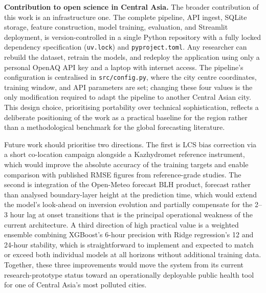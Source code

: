 \textbf{Contribution to open science in Central Asia.} The broader contribution of this work is an infrastructure one. The complete pipeline, API ingest, SQLite storage, feature construction, model training, evaluation, and Streamlit deployment, is version-controlled in a single Python repository with a fully locked dependency specification (\texttt{uv.lock}) and \texttt{pyproject.toml}. Any researcher can rebuild the dataset, retrain the models, and redeploy the application using only a personal OpenAQ API key and a laptop with internet access. The pipeline's configuration is centralised in \texttt{src/config.py}, where the city centre coordinates, training window, and API parameters are set; changing these four values is the only modification required to adapt the pipeline to another Central Asian city. This design choice, prioritising portability over technical sophistication, reflects a deliberate positioning of the work as a practical baseline for the region rather than a methodological benchmark for the global forecasting literature.

Future work should prioritise two directions. The first is LCS bias correction via a short co-location campaign alongside a Kazhydromet reference instrument, which would improve the absolute accuracy of the training targets and enable comparison with published RMSE figures from reference-grade studies. The second is integration of the Open-Meteo forecast BLH product, forecast rather than analysed boundary-layer height at the prediction time, which would extend the model's look-ahead on inversion evolution and partially compensate for the 2--3 hour lag at onset transitions that is the principal operational weakness of the current architecture. A third direction of high practical value is a weighted ensemble combining XGBoost's 6-hour precision with Ridge regression's 12 and 24-hour stability, which is straightforward to implement and expected to match or exceed both individual models at all horizons without additional training data. Together, these three improvements would move the system from its current research-prototype status toward an operationally deployable public health tool for one of Central Asia's most polluted cities.
